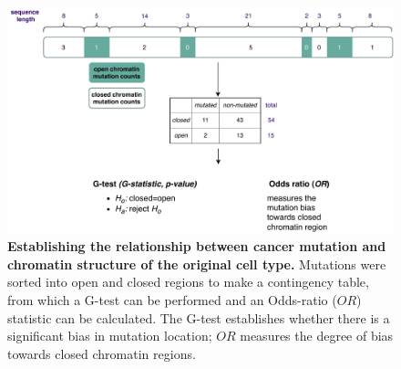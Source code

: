 \begin{figure}[ht!]
    \centering
    \includegraphics[scale=0.82]{graphics/mutdistribution.pdf}
    \caption{\textbf{Establishing the relationship between cancer mutation and chromatin structure of the original cell type.} Mutations were sorted into open and closed regions to make a contingency table, from which a G-test can be performed and an Odds-ratio ($OR$) statistic can be calculated. The G-test establishes whether there is a significant bias in mutation location; $OR$ measures the degree of bias towards closed chromatin regions.}
    \label{fig:gle_workflow}
\end{figure}
